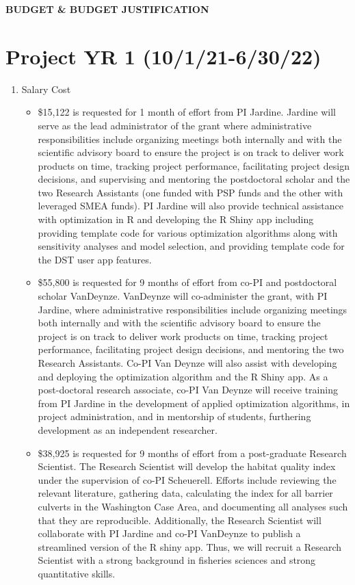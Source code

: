 \begin{center} \textbf{BUDGET \& BUDGET JUSTIFICATION} \end{center}


\section{Project YR 1 (10/1/21-6/30/22)}
\begin{enumerate}
\item Salary Cost
\begin{itemize}
\item  \$15,122 is requested for 1 month of effort from PI Jardine. Jardine will serve as the lead administrator of the grant where administrative responsibilities include organizing meetings both internally and with the scientific advisory board to ensure the project is on track to deliver work products on time, tracking project performance, facilitating project design decisions, and supervising and mentoring the postdoctoral scholar and the two Research Assistants (one funded with PSP funds and the other with leveraged SMEA funds). PI Jardine will also provide technical assistance with optimization in R and developing the R Shiny app including providing template code for various optimization algorithms along with sensitivity analyses and model selection, and providing template code for the DST user app features.
\item \$55,800 is requested for 9 months of effort from co-PI and postdoctoral scholar VanDeynze. VanDeynze will co-administer the grant, with PI Jardine, where administrative responsibilities include organizing meetings both internally and with the scientific advisory board to ensure the project is on track to deliver work products on time, tracking project performance, facilitating project design decisions, and mentoring the two Research Assistants. Co-PI Van Deynze will also assist with developing and deploying the optimization algorithm and the R Shiny app. As a post-doctoral research associate, co-PI Van Deynze will receive training from PI Jardine in the development of applied optimization algorithms, in project administration, and in mentorship of students, furthering development as an independent researcher. 
\item \$38,925 is requested for 9 months of effort from a post-graduate Research Scientist. The Research Scientist will develop the habitat quality index under the supervision of co-PI Scheuerell. Efforts include reviewing the relevant literature, gathering data, calculating the index for all barrier culverts in the Washington Case Area, and documenting all analyses such that they are reproducible. Additionally, the Research Scientist will collaborate with PI Jardine and co-PI VanDeynze to publish a streamlined version of the R shiny app. Thus, we will recruit a Research Scientist with a strong background in fisheries sciences and strong quantitative skills.

\end{itemize}
\end{enumerate}

